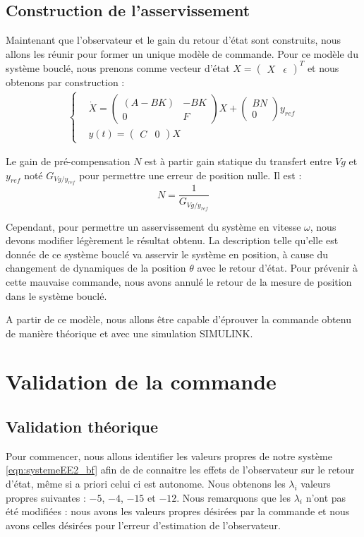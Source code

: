 \subsection{Construction de l'asservissement}
Maintenant que l'observateur et le gain du retour d'état sont construits, nous allons les réunir pour former un unique modèle de commande. Pour ce modèle du système bouclé, nous prenons comme vecteur d'état $X=\begin{pmatrix}
X&\epsilon
\end{pmatrix}^T$ et nous obtenons par construction :
\begin{align*}
\label{eqn:systemeEE2_bf}
\left\lbrace
\begin{aligned}
& \dot{X} = \begin{pmatrix}
(A-BK) & -BK\\
0& F
\end{pmatrix}X+\begin{pmatrix}
BN\\0
\end{pmatrix}y_{ref} \\
& y(t) = \begin{pmatrix}
C & 0
\end{pmatrix}X
\end{aligned}
\right.
\end{align*} 

Le gain de pré-compensation $N$ est à partir gain statique du transfert entre $Vg$ et $y_{ref}$ noté $G_{Vg/y_{ref}}$ pour permettre une erreur de position nulle. Il est : 
\begin{equation}
N = \frac{1}{G_{Vg/y_{ref}}}
\end{equation}


Cependant, pour permettre un asservissement du système en vitesse $\omega$, nous devons modifier légèrement le résultat obtenu. La description telle qu'elle est donnée de ce système bouclé va asservir le système en position, à cause du changement de dynamiques de la position $\theta$ avec le retour d'état. Pour prévenir à cette mauvaise commande, nous avons annulé le retour de la mesure de position dans le système bouclé. 


A partir de ce modèle, nous allons être capable d'éprouver la commande obtenu de manière théorique et avec une simulation SIMULINK.

\section{Validation de la commande}
\subsection{Validation théorique}
Pour commencer, nous allons identifier les valeurs propres de notre système \ref{eqn:systemeEE2_bf} afin de de connaitre les effets de l'observateur sur le retour d'état, même si a priori celui ci est autonome. Nous obtenons les $\lambda_i$ valeurs propres suivantes : $-5$, $-4$, $-15$ et $-12$. Nous remarquons que les $\lambda_i$ n'ont pas été modifiées : nous avons les valeurs propres désirées par la commande et nous avons celles désirées pour l'erreur d'estimation de l'observateur. 

